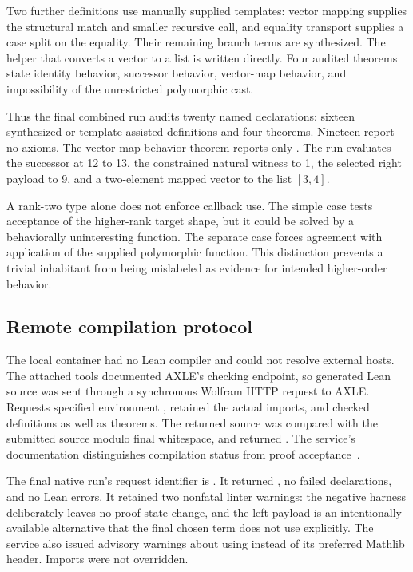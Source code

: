 Two further definitions use manually supplied templates: vector mapping supplies the structural match and smaller recursive call, and equality transport supplies a case split on the equality. Their remaining branch terms are synthesized. The helper that converts a vector to a list is written directly. Four audited theorems state identity behavior, successor behavior, vector-map behavior, and impossibility of the unrestricted polymorphic cast.

Thus the final combined run audits twenty named declarations: sixteen synthesized or template-assisted definitions and four theorems. Nineteen report no axioms. The vector-map behavior theorem reports only . The run evaluates the successor at 12 to 13, the constrained natural witness to 1, the selected right payload to 9, and a two-element mapped vector to the list $[3,4]$.

A rank-two type alone does not enforce callback use. The simple  case tests acceptance of the higher-rank target shape, but it could be solved by a behaviorally uninteresting function. The separate  case forces agreement with application of the supplied polymorphic function. This distinction prevents a trivial inhabitant from being mislabeled as evidence for intended higher-order behavior.

\subsection{Remote compilation protocol}
The local container had no Lean compiler and could not resolve external hosts. The attached tools documented AXLE's checking endpoint, so generated Lean source was sent through a synchronous Wolfram HTTP request to AXLE. Requests specified environment , retained the actual imports, and checked definitions as well as theorems. The returned source was compared with the submitted source modulo final whitespace, and  returned . The service's documentation distinguishes compilation status from proof acceptance~\cite{axle}.

The final native run's request identifier is . It returned , no failed declarations, and no Lean errors. It retained two nonfatal linter warnings: the negative  harness deliberately leaves no proof-state change, and the left payload is an intentionally available alternative that the final chosen term does not use explicitly. The service also issued advisory warnings about using  instead of its preferred Mathlib header. Imports were not overridden.


